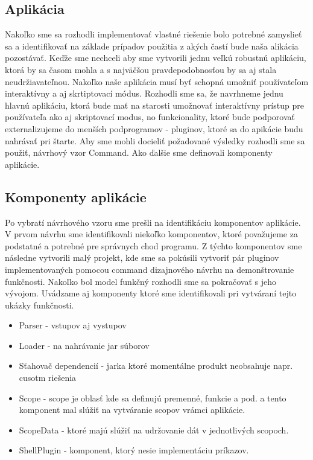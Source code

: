 \subsection{Aplikácia}
\indent Nakoľko sme sa rozhodli implementovať vlastné riešenie bolo potrebné zamyslieť sa a identifikovať na základe prípadov použitia z akých častí bude naša alikácia pozostávať. Keďže sme nechceli aby sme vytvorili jednu veľkú robustnú aplikáciu, ktorá by sa časom mohla a s najväčšou pravdepodobnosťou by sa  aj stala neudržiavateľnou. Nakoľko naše aplikácia musí byť schopná umožniť používateľom interaktívny a aj skrtiptovací módus. Rozhodli sme sa, že navrhneme jednu hlavnú aplikáciu, ktorá bude mať na starosti umožnovať interaktívny prístup pre používateľa ako aj skriptovací modus, no funkcionality, ktoré bude podporovať externalizujeme do menších podprogramov - pluginov, ktoré sa do apikácie budu nahrávať pri štarte. Aby sme mohli docieliť požadované výsledky rozhodli sme sa použiť, návrhový vzor Command. Ako ďalšie sme definovali komponenty aplikácie.

\subsection{Komponenty aplikácie}
\indent Po vybratí návrhového vzoru sme prešli na identifikáciu komponentov aplikácie. V prvom návrhu sme identifikovali niekoľko komponentov, ktoré považujeme za podstatné a potrebné pre správnych chod programu. Z týchto komponentov sme následne vytvorili malý projekt, kde sme sa pokúsili vytvoriť pár pluginov implementovaných pomocou command dizajnového návrhu na demonštrovanie funkčnosti. Nakoľko bol model funkčný rozhodli sme sa pokračovať s jeho vývojom. Uvádzame aj komponenty ktoré sme identifikovali pri vytváraní tejto ukázky funkčnosti.
\begin{itemize}
	\item Parser - vstupov aj vystupov
	\item Loader - na nahrávanie  jar súborov
	\item Sťahovač dependencií - jarka ktoré momentálne produkt neobsahuje napr. cusotm riešenia
	\item Scope - scope je oblasť kde sa definujú premenné, funkcie a pod. a tento komponent mal slúžiť na vytváranie scopov vrámci aplikácie.
	\item ScopeData - ktoré majú slúžiť na udržovanie dát v jednotlivých scopoch.
	\item ShellPlugin - komponent, ktorý nesie implementáciu príkazov.
\end{itemize}

